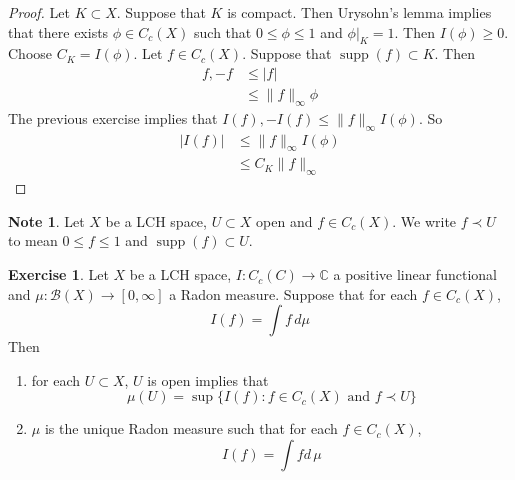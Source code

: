 \documentclass{book}
\theoremstyle{definition}
\newtheorem{note}[definition]{Note}
\newtheorem{ex}[definition]{Exercise}
\newcommand{\C}{\mathbb{C}}
\newcommand{\MB}{\mathcal{B}}
\newcommand{\lex}[1]{\label{ex:#1}}
\DeclareMathOperator{\supp}{supp}
\DeclareMathOperator*{\0}{\mbf{0}}
\DeclareMathOperator*{\1}{\mbf{1}}
\newcommand{\RG}{[0,\infty]}
\newcommand{\dmu}{\, d \mu}
\begin{document}
	\begin{proof}
	Let $K \subset X$. Suppose that $K$ is compact. Then Urysohn's lemma implies that there exists $\phi \in C_c(X)$ such that $0 \leq \phi \leq 1$ and $\phi|_K = 1$. Then $I(\phi) \geq 0$. Choose $C_K = I(\phi)$. Let $f \in C_c(X)$. Suppose that $\supp(f) \subset K$. Then 
	\begin{align*}
	f,-f 
	&\leq |f| \\
	& \leq \|f\|_{\infty} \phi
	\end{align*}
	The previous exercise implies that $I(f), -I(f) \leq \|f\|_{\infty} I(\phi)$. So 
	\begin{align*}
	|I(f)| 
	&\leq \|f\|_{\infty} I(\phi) \\
	&\leq  C_K \|f\|_{\infty}  
	\end{align*}
	\end{proof}
	
	\begin{note}
	Let $X$ be a LCH space, $U \subset X$ open and $f \in C_c(X)$. We write $f \prec U$ to mean $0 \leq f \leq 1$ and $\supp(f) \subset U$. 
	\end{note}
	
	\begin{ex} \lex{00000} 
	Let $X$ be a LCH space, $I: C_c(C) \rightarrow \C$ a positive linear functional and $\mu:\MB(X) \rightarrow \RG$ a Radon measure. Suppose that for each $f \in C_c(X)$, $$I(f) = \int f \dmu$$
	Then 
	\begin{enumerate}
	\item for each $U \subset X$, $U$ is open implies that $$\mu(U) = \sup \{I(f): f \in C_c(X) \text{ and } f \prec U \}$$ 
	\item $\mu$ is the unique Radon measure such that for each $f \in C_c(X)$, $$I(f) = \int f d \, \mu$$
\end{enumerate}	 
	\end{ex}
	
\end{document}
